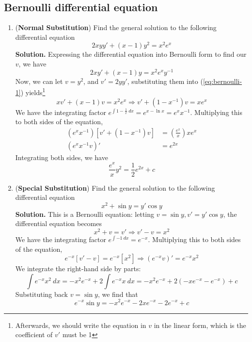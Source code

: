 \documentclass[a4paper]{article}
\begin{document}
\subsection{Bernoulli differential equation}
\begin{enumerate}
    \item (\textbf{Normal Substitution}) Find the general solution to the following differential equation
    \begin{equation} \label{eq:bernoulli-1}
        2xyy'+(x-1)y^2=x^2e^x
    \end{equation} 
    \textbf{Solution.} Expressing the differential equation into Bernoulli form to find our $v$, we have
    \begin{equation*}
        2xy'+(x-1)y=x^2e^xy^{-1}
    \end{equation*}
    Now, we can let $v=y^2$, and $v'=2yy'$, substituting them into (\ref{eq:bernoulli-1}) yields\footnote{Afterwards, we should write the equation in $v$ in the linear form, which is the coefficient of $v'$ must be 1}
    \begin{equation*}
        xv'+(x-1)v=x^2e^x \Rightarrow v'+(1-x^{-1})v=xe^x
    \end{equation*}
    We have the integrating factor $e^{\int 1-\frac{1}{x}~dx}=e^{x-\ln x}=e^xx^{-1}$. Multiplying this to both sides of the equation,
    \begin{align*}
        (e^xx^{-1})[v'+(1-x^{-1})v]&=(\frac{e^x}{x})xe^x \\
        (e^xx^{-1}v)'&=e^{2x}
    \end{align*}
    Integrating both sides, we have
    \begin{equation*}
        \frac{e^x}{x}y^2=\frac{1}{2}e^{2x}+c
    \end{equation*}
    \item (\textbf{Special Substitution}) Find the general solution to the following differential equation
    \begin{equation}
        x^2+\sin y=y'\cos y
    \end{equation}
    \textbf{Solution.} This is a Bernoulli equation: letting $v=\sin y,v'=y'\cos y$, the differential equation becomes
    \begin{equation*}
        x^2+v=v'\Rightarrow v'-v=x^2
    \end{equation*}
    We have the integrating factor $e^{\int-1~dx}=e^{-x}$. Multiplying this to both sides of the equation,
    \begin{equation*}
        e^{-x}[v'-v]=e^{-x}[x^2]\Rightarrow (e^{-x}v)'=e^{-x}x^2
    \end{equation*}
    We integrate the right-hand side by parts:
    \begin{equation*}
        \int e^{-x}x^2~dx=-x^2e^{-x}+2\int e^{-x}x~dx=-x^2e^{-x}+2(-xe^{-x}-e^{-x})+c
    \end{equation*}
    Substituting back $v=\sin y$, we find that
    \begin{equation*}
        e^{-x}\sin y=-x^2e^{-x}-2xe^{-x}-2e^{-x}+c
    \end{equation*}    
\end{enumerate}
\newpage
\end{document}
